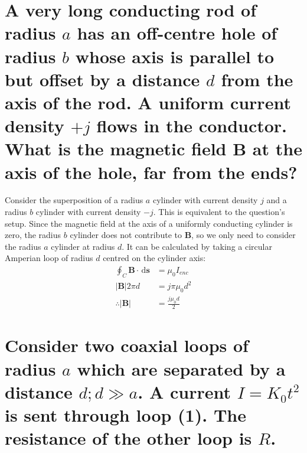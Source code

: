 \documentclass[a4paper]{scrartcl}
\begin{document}
\section{A very long conducting rod of radius \(a\) has an off-centre hole of radius \(b\) whose axis is parallel to but offset by a distance \(d\) from the axis of the rod. A uniform current density \(+j\) flows in the conductor. What is the magnetic field \(\mathbf{B}\) at the axis of the hole, far from the ends?}
Consider the superposition of a radius \(a\) cylinder with current density \(j\) and a radius \(b\) cylinder with current density \(-j\). This is equivalent to the question's setup. Since the magnetic field at the axis of a uniformly conducting cylinder is zero, the radius \(b\) cylinder does not contribute to \(\mathbf{B}\), so we only need to consider the radius \(a\) cylinder at radius \(d\). It can be calculated by taking a circular Amperian loop of radius \(d\) centred on the cylinder axis:
\begin{align*}
    \oint_C \mathbf{B} \cdot \,\mathrm{d}\mathbf{s} &= \mu_0 I_{enc} \\
    |\mathbf{B}| 2 \pi d &= j \pi \mu_0 d^2 \\
    \therefore |\mathbf{B}| &= \frac{j \mu_0 d}{2}
\end{align*}

\pagebreak
\section{Consider two coaxial loops of radius \(a\) which are separated by a distance \(d; d \gg a\). A current \(I = K_0 t^2\) is sent through loop (1). The resistance of the other loop is \(R\).}
\end{document}
